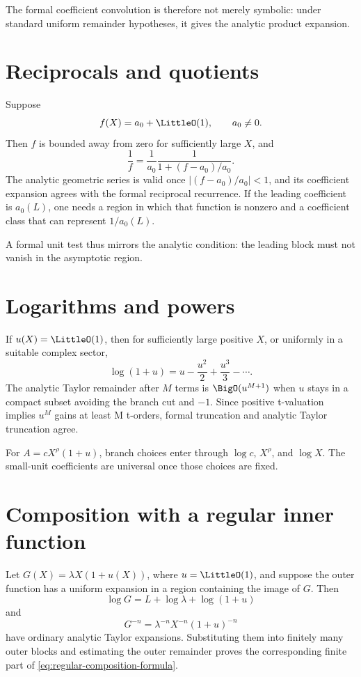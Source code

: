\documentclass[11pt,openany]{book}
\theoremstyle{definition}
\theoremstyle{plain}
\theoremstyle{remark}
\begin{document}
The formal coefficient convolution is therefore not merely symbolic: under
standard uniform remainder hypotheses, it gives the analytic product
expansion.

\section{Reciprocals and quotients}
Suppose
\[
 f(X)=a_0+\LittleO(1),
 \qquad a_0\ne0.
\]
Then \(f\) is bounded away from zero for sufficiently large \(X\), and
\[
 \frac1f=\frac1{a_0}\frac1{1+(f-a_0)/a_0}.
\]
The analytic geometric series is valid once
\(|(f-a_0)/a_0|<1\), and its coefficient expansion agrees with the formal
reciprocal recurrence.  If the leading coefficient is \(a_0(L)\), one needs a
region in which that function is nonzero and a coefficient class that can
represent \(1/a_0(L)\).

A formal unit test thus mirrors the analytic condition: the leading block must
not vanish in the asymptotic region.

\section{Logarithms and powers}
If \(u(X)=\LittleO(1)\), then for sufficiently large positive \(X\), or uniformly in
a suitable complex sector,
\[
 \log(1+u)=u-\frac{u^2}{2}+\frac{u^3}{3}-\cdots.
\]
The analytic Taylor remainder after \(M\) terms is
\(\BigO(u^{M+1})\) when \(u\) stays in a compact subset avoiding the branch cut and
\(-1\).  Since positive t-valuation implies \(u^M\) gains at least M t-orders,
formal truncation and analytic Taylor truncation agree.

For \(A=cX^\rho(1+u)\), branch choices enter through \(\log c\),
\(X^\rho\), and \(\log X\).  The small-unit coefficients are universal once
those choices are fixed.

\section{Composition with a regular inner function}
Let \(G(X)=\lambda X(1+u(X))\), where \(u=\LittleO(1)\), and suppose the outer
function has a uniform expansion in a region containing the image of \(G\).
Then
\[
 \log G=L+\log\lambda+\log(1+u)
\]
and
\[
 G^{-n}=\lambda^{-n}X^{-n}(1+u)^{-n}
\]
have ordinary analytic Taylor expansions.  Substituting them into finitely many
outer blocks and estimating the outer remainder proves the corresponding
finite part of \cref{eq:regular-composition-formula}.
\end{document}
